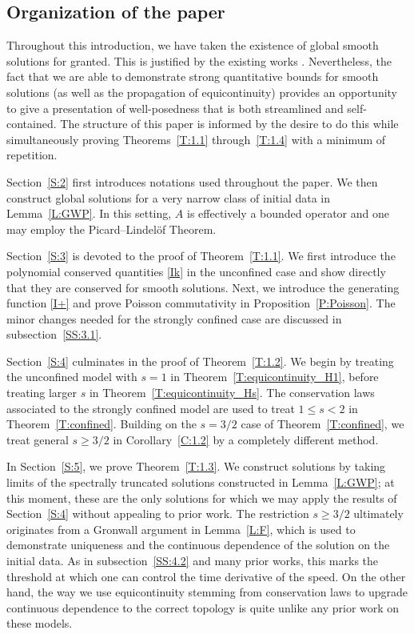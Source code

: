 \documentclass{amsart}
\theoremstyle{definition}
\numberwithin{equation}{section}
\begin{document}
\subsection*{Organization of the paper}  Throughout this introduction, we have taken the existence of global smooth solutions for granted.  This is justified by the existing works \cite{AG,Pohozaev85}.  Nevertheless, the fact that we are able to demonstrate strong quantitative bounds for smooth solutions (as well as the propagation of equicontinuity) provides an opportunity to give a presentation of well-posedness that is both streamlined and self-contained.  The structure of this paper is informed by the desire to do this while simultaneously proving Theorems~\ref{T:1.1} through~\ref{T:1.4} with a minimum of repetition.

Section~\ref{S:2} first introduces notations used throughout the paper.  We then construct global solutions for a very narrow class of initial data in Lemma~\ref{L:GWP}.  In this setting, $A$ is effectively a bounded operator and one may employ the Picard--Lindel\"of Theorem.

Section~\ref{S:3} is devoted to the proof of Theorem~\ref{T:1.1}.  We first introduce the polynomial conserved quantities \eqref{Ik} in the unconfined case and show directly that they are conserved for smooth solutions.  Next, we introduce the generating function \eqref{I+} and prove Poisson commutativity in Proposition~\ref{P:Poisson}.  The minor changes needed for the strongly confined case are discussed in subsection~\ref{SS:3.1}.

Section~\ref{S:4} culminates in the proof of Theorem~\ref{T:1.2}.  We begin by treating the unconfined model with $s=1$ in Theorem~\ref{T:equicontinuity_H1}, before treating larger $s$ in Theorem~\ref{T:equicontinuity_Hs}.  The conservation laws associated to the strongly confined model are used to treat $1\leq s<2$ in Theorem~\ref{T:confined}.  Building on the $s=3/2$ case of Theorem~\ref{T:confined}, we treat general $s\geq 3/2$ in Corollary~\ref{C:1.2} by a completely different method.

In Section~\ref{S:5}, we prove Theorem~\ref{T:1.3}.  We construct solutions by taking limits of the spectrally truncated solutions constructed in Lemma~\ref{L:GWP}; at this moment, these are the only solutions for which we may apply the results of Section~\ref{S:4} without appealing to prior work.  The restriction $s\geq 3/2$ ultimately originates from a Gronwall argument in Lemma~\ref{L:F}, which is used to demonstrate uniqueness and the continuous dependence of the solution on the initial data.  As in subsection~\ref{SS:4.2} and many prior works, this marks the threshold at which one can control the time derivative of the speed.  On the other hand, the way we use equicontinuity stemming from conservation laws to upgrade continuous dependence to the correct topology is quite unlike any prior work on these models.
\end{document}
